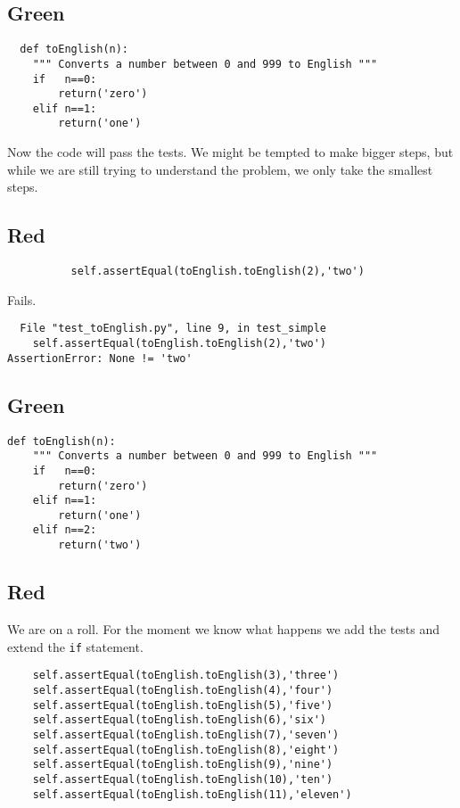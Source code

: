 \documentclass{paper}
\begin{document}
\subsection{Green}
\begin{lstlisting}
  def toEnglish(n):
    """ Converts a number between 0 and 999 to English """
    if   n==0:
        return('zero')
    elif n==1:
        return('one')
\end{lstlisting}
Now the code will pass the tests. We might be tempted to make bigger
steps, but while we are still trying to understand the problem, we only
take the smallest steps.
\subsection{Red}
\begin{lstlisting}
          self.assertEqual(toEnglish.toEnglish(2),'two')
\end{lstlisting}
Fails.
\begin{verbatim}
  File "test_toEnglish.py", line 9, in test_simple
    self.assertEqual(toEnglish.toEnglish(2),'two')
AssertionError: None != 'two'
\end{verbatim}
\subsection{Green}
\begin{lstlisting}
def toEnglish(n):
    """ Converts a number between 0 and 999 to English """
    if   n==0:
        return('zero')
    elif n==1:
        return('one')
    elif n==2:
        return('two')
\end{lstlisting}
\subsection{Red}
We are on a roll. For the moment we know what happens we add the tests
and extend the {\tt if} statement.
\begin{lstlisting}
    self.assertEqual(toEnglish.toEnglish(3),'three')
    self.assertEqual(toEnglish.toEnglish(4),'four')
    self.assertEqual(toEnglish.toEnglish(5),'five')
    self.assertEqual(toEnglish.toEnglish(6),'six')
    self.assertEqual(toEnglish.toEnglish(7),'seven')
    self.assertEqual(toEnglish.toEnglish(8),'eight')
    self.assertEqual(toEnglish.toEnglish(9),'nine')
    self.assertEqual(toEnglish.toEnglish(10),'ten')
    self.assertEqual(toEnglish.toEnglish(11),'eleven')
\end{lstlisting}
\end{document}
